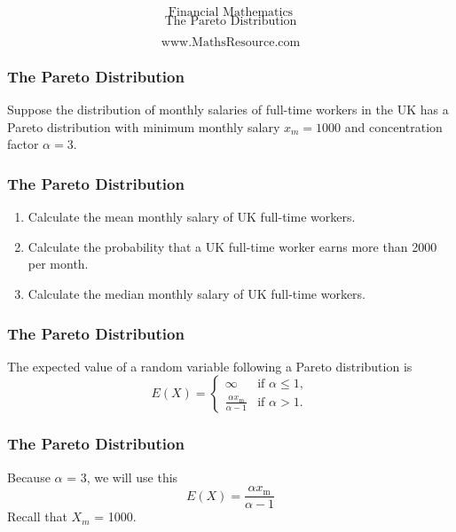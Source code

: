 \documentclass{beamer}
\begin{document}
\begin{frame}
\bigskip
{
\Huge
\[ \mbox{Financial Mathematics}  \]
\huge
\[ \mbox{The Pareto Distribution}  \]
}

{
\LARGE
\[ \mbox{www.MathsResource.com}  \]
}
\end{frame}
\begin{frame}
\frametitle{The Pareto Distribution}
\Large
\vspace{-1.6cm}
Suppose the distribution of monthly salaries of full-time workers in the UK has
a Pareto distribution with minimum monthly salary $x_m = 1000$ and concentration
factor $\alpha = 3$. 

\end{frame}
\begin{frame}
	\frametitle{The Pareto Distribution}
	\Large
\begin{enumerate}
\item Calculate the mean monthly salary of UK full-time workers.
\item Calculate the probability that a UK full-time worker earns more than 2000 per month.
\item Calculate the median monthly salary of UK full-time workers.
\end{enumerate}
\end{frame}

\begin{frame}
\frametitle{The Pareto Distribution}
\Large
\vspace{-1.5cm}
The expected value of a random variable following a Pareto distribution is
\[E(X)= \begin{cases} \infty & \text{if }\alpha\le 1, \\ \frac{\alpha x_\mathrm{m}}{\alpha-1} & \text{if }\alpha>1. \end{cases}
\]

\end{frame}

\begin{frame}
	\frametitle{The Pareto Distribution}
	\Large
	\vspace{-2.5cm}
Because \textbf{$\alpha$} = $3$, we will use this
{
\LARGE
\[
E(X)= \frac{\alpha x_\mathrm{m}}{\alpha-1}   
\]
}
Recall that $X_m$ = 1000.
\end{frame}
\end{document}
